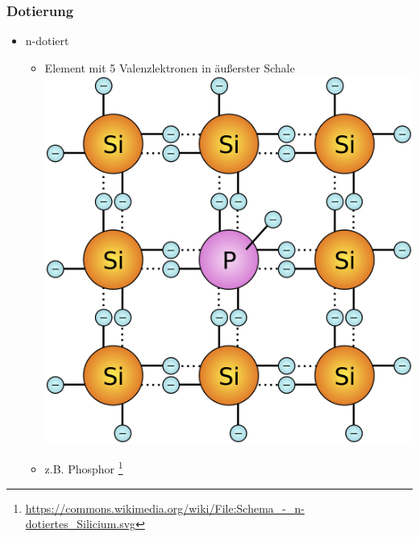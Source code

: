 \begin{frame}
    \frametitle{Dotierung}
      	\begin{itemize}
			\item n-dotiert
      		\begin{itemize}
				\item Element mit 5 Valenzlektronen in äußerster Schale
				 \includegraphics[width=.65\textwidth]{e12/n-dot}
				 \item z.B. Phosphor
        \footnote{\tiny \url{https://commons.wikimedia.org/wiki/File:Schema_-_n-dotiertes_Silicium.svg}}
    	\end{itemize}
    \end{itemize}
\end{frame}




